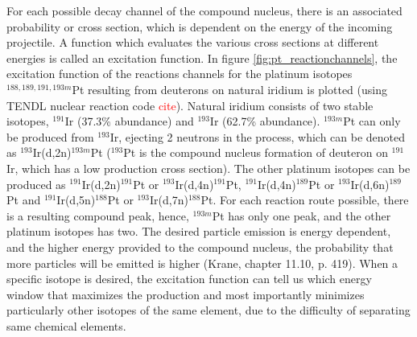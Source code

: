 \documentclass[a4paper,11pt,twoside]{book}
\begin{document}
\noindent For each possible decay channel of the compound nucleus, there is an associated probability or cross section, which is dependent on the energy of the incoming projectile. A function which evaluates the various cross sections at different energies is called an excitation function. In figure \ref{fig:pt_reactionchannels}, the excitation function of the reactions channels for the platinum isotopes $^{188, 189, 191,193m}$Pt resulting from deuterons on natural iridium is plotted (using TENDL nuclear reaction code \textcolor{red}{cite}). Natural iridium consists of two stable isotopes, $^{191}$Ir (37.3\% abundance) and $^{193}$Ir (62.7\% abundance). $^{193m}$Pt can only be produced from $^{193}$Ir, ejecting 2 neutrons in the process, which can be denoted as $^{193}$Ir(d,2n)$^{193m}$Pt ($^{193}$Pt is the compound nucleus formation of deuteron on $^{191}$Ir, which has a low production cross section). The other platinum isotopes can be produced as $^{191}$Ir(d,2n)$^{191}$Pt or $^{193}$Ir(d,4n)$^{191}$Pt, $^{191}$Ir(d,4n)$^{189}$Pt or $^{193}$Ir(d,6n)$^{189}$Pt and $^{191}$Ir(d,5n)$^{188}$Pt or $^{193}$Ir(d,7n)$^{188}$Pt. For each reaction route possible, there is a resulting compound peak, hence, $^{193m}$Pt has only one peak, and the other platinum isotopes has two. The desired particle emission is energy dependent, and the higher energy provided to the compound nucleus, the probability that more particles will be emitted is higher (Krane, chapter 11.10, p. 419). When a specific isotope is desired, the excitation function can tell us which energy window that maximizes the production and most importantly minimizes particularly other isotopes of the same element, due to the difficulty of separating same chemical elements. \\
\end{document}
